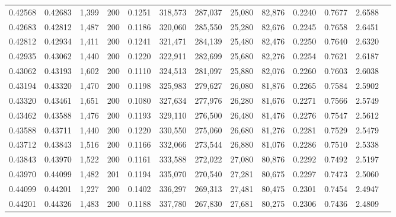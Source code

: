 \begin{tabular}{rrrrrrrrrrrrr}
0.42568 & 0.42683 & 1,399 & 200 &                                     0.1251 & 318,573 & 287,037 &  25,080 &  82,876 & 0.2240 & 0.7677 & 2.6588 \\
0.42683 & 0.42812 & 1,487 & 200 &                                     0.1186 & 320,060 & 285,550 &  25,280 &  82,676 & 0.2245 & 0.7658 & 2.6451 \\
0.42812 & 0.42934 & 1,411 & 200 &                                     0.1241 & 321,471 & 284,139 &  25,480 &  82,476 & 0.2250 & 0.7640 & 2.6320 \\
0.42935 & 0.43062 & 1,440 & 200 &                                     0.1220 & 322,911 & 282,699 &  25,680 &  82,276 & 0.2254 & 0.7621 & 2.6187 \\
0.43062 & 0.43193 & 1,602 & 200 &                                     0.1110 & 324,513 & 281,097 &  25,880 &  82,076 & 0.2260 & 0.7603 & 2.6038 \\
0.43194 & 0.43320 & 1,470 & 200 &                                     0.1198 & 325,983 & 279,627 &  26,080 &  81,876 & 0.2265 & 0.7584 & 2.5902 \\
0.43320 & 0.43461 & 1,651 & 200 &                                     0.1080 & 327,634 & 277,976 &  26,280 &  81,676 & 0.2271 & 0.7566 & 2.5749 \\
0.43462 & 0.43588 & 1,476 & 200 &                                     0.1193 & 329,110 & 276,500 &  26,480 &  81,476 & 0.2276 & 0.7547 & 2.5612 \\
0.43588 & 0.43711 & 1,440 & 200 &                                     0.1220 & 330,550 & 275,060 &  26,680 &  81,276 & 0.2281 & 0.7529 & 2.5479 \\
0.43712 & 0.43843 & 1,516 & 200 &                                     0.1166 & 332,066 & 273,544 &  26,880 &  81,076 & 0.2286 & 0.7510 & 2.5338 \\
0.43843 & 0.43970 & 1,522 & 200 &                                     0.1161 & 333,588 & 272,022 &  27,080 &  80,876 & 0.2292 & 0.7492 & 2.5197 \\
0.43970 & 0.44099 & 1,482 & 201 &                                     0.1194 & 335,070 & 270,540 &  27,281 &  80,675 & 0.2297 & 0.7473 & 2.5060 \\
0.44099 & 0.44201 & 1,227 & 200 &                                     0.1402 & 336,297 & 269,313 &  27,481 &  80,475 & 0.2301 & 0.7454 & 2.4947 \\
0.44201 & 0.44326 & 1,483 & 200 &                                     0.1188 & 337,780 & 267,830 &  27,681 &  80,275 & 0.2306 & 0.7436 & 2.4809 \\

\end{tabular}
